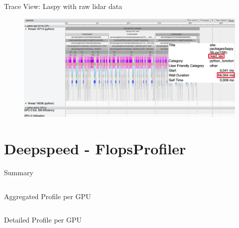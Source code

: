 \documentclass[compress,aspectratio=169]{beamer}
\begin{document}
\begin{frame}{Trace View: Laspy with raw lidar data}
    \vspace{-1em}
\begin{center}
    \begin{figure}
        \includegraphics[width=1\textwidth]{./assets/scap_gtx1080_profiler-torch_sample-points_14650750_trace-view-laspy}
    \end{figure}
    \end{center}
\end{frame}


\section{Deepspeed - FlopsProfiler}
\sectionIntro %

\begin{frame}[fragile]{Summary}
        \footnotesize\inputminted[xleftmargin=1em,linenos,fontsize=\scriptsize, firstline=1,lastline=16]{python}{./assets/scap_gtx1080_deepspeed_14615344_4294967294_one-epoch.txt}

\end{frame}

\begin{frame}[fragile]{Aggregated Profile per GPU}
        \footnotesize\inputminted[xleftmargin=1em,linenos,fontsize=\scriptsize, firstline=18,lastline=31]{python}{./assets/scap_gtx1080_deepspeed_14615344_4294967294_one-epoch.txt}

\end{frame}

\begin{frame}[fragile]{Detailed Profile per GPU}
        \footnotesize\inputminted[xleftmargin=1em,linenos,fontsize=\tiny, firstline=33,lastline=48, breaklines]{python}{./assets/scap_gtx1080_deepspeed_14615344_4294967294_one-epoch.txt}

\end{frame}
\end{document}
